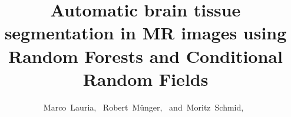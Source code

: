 \documentclass[journal]{IEEEtran}
\begin{document}
%
\title{Automatic brain tissue segmentation in MR images using Random Forests and Conditional Random Fields}
%
%
%

\author{Marco~Lauria,~
        Robert~Münger,~
        and~Moritz~Schmid,~}%

% 
%
\end{document}
